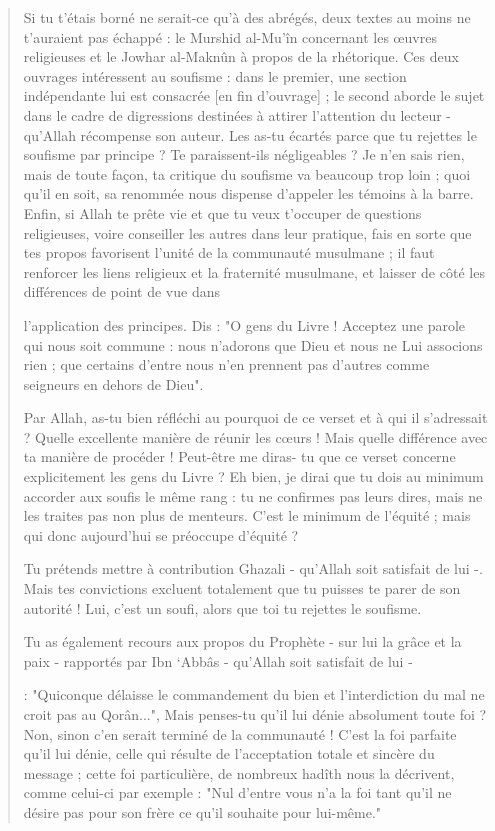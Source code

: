 \begin{quote}
Si tu t'étais borné ne serait-ce qu'à des abrégés, deux textes au moins
ne t'auraient pas échappé : le Murshid al-Mu'în concernant les œuvres
religieuses et le Jowhar al-Maknûn à propos de la rhétorique. Ces deux
ouvrages intéressent au soufisme : dans le premier, une section
indépendante lui est consacrée {[}en fin d'ouvrage{]} ; le second aborde
le sujet dans le cadre de digressions destinées à attirer l'attention du
lecteur - qu'Allah récompense son auteur. Les as-tu écartés parce que tu
rejettes le soufisme par principe ? Te paraissent-ils négligeables ? Je
n'en sais rien, mais de toute façon, ta critique du soufisme va beaucoup
trop loin ; quoi qu'il en soit, sa renommée nous dispense d'appeler les
témoins à la barre. Enfin, si Allah te prête vie et que tu veux
t'occuper de questions religieuses, voire conseiller les autres dans
leur pratique, fais en sorte que tes propos favorisent l'unité de la
communauté musulmane ; il faut renforcer les liens religieux et la
fraternité musulmane, et laisser de côté les différences de point de vue
dans

l'application des principes. Dis : "O gens du Livre ! Acceptez une
parole qui nous soit commune : nous n'adorons que Dieu et nous ne Lui
associons rien ; que certains d'entre nous n'en prennent pas d'autres
comme seigneurs en dehors de Dieu".

Par Allah, as-tu bien réfléchi au pourquoi de ce verset et à qui il
s'adressait ? Quelle excellente manière de réunir les cœurs ! Mais
quelle différence avec ta manière de procéder ! Peut-être me diras- tu
que ce verset concerne explicitement les gens du Livre ? Eh bien, je
dirai que tu dois au minimum accorder aux soufis le même rang : tu ne
confirmes pas leurs dires, mais ne les traites pas non plus de menteurs.
C'est le minimum de l'équité ; mais qui donc aujourd'hui se préoccupe
d'équité ?

Tu prétends mettre à contribution Ghazali - qu'Allah soit satisfait de
lui -. Mais tes convictions excluent totalement que tu puisses te parer
de son autorité ! Lui, c'est un soufi, alors que toi tu rejettes le
soufisme.

Tu as également recours aux propos du Prophète - sur lui la grâce et la
paix - rapportés par Ibn `Abbâs - qu'Allah soit satisfait de lui -

: "Quiconque délaisse le commandement du bien et l'interdiction du mal
ne croit pas au Qorân...", Mais penses-tu qu'il lui dénie absolument
toute foi ? Non, sinon c'en serait terminé de la communauté ! C'est la
foi parfaite qu'il lui dénie, celle qui résulte de l'acceptation totale
et sincère du message ; cette foi particulière, de nombreux hadîth nous
la décrivent, comme celui-ci par exemple : "Nul d'entre vous n'a la foi
tant qu'il ne désire pas pour son frère ce qu'il souhaite pour
lui-même."


\end{quote}
